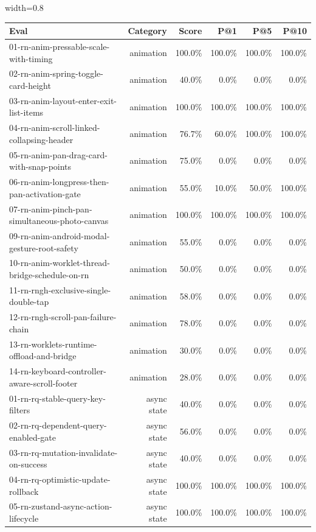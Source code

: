\begin{table}[htbp]
\centering
\begin{adjustbox}{width=0.8\textwidth}
\begin{tabular}{lrrrrr}
\toprule
Eval & Category & Score & P@1 & P@5 & P@10 \\
\midrule
01-rn-anim-pressable-scale-with-timing & animation & 100.0\% & 100.0\% & 100.0\% & 100.0\% \\
02-rn-anim-spring-toggle-card-height & animation & 40.0\% & 0.0\% & 0.0\% & 0.0\% \\
03-rn-anim-layout-enter-exit-list-items & animation & 100.0\% & 100.0\% & 100.0\% & 100.0\% \\
04-rn-anim-scroll-linked-collapsing-header & animation & 76.7\% & 60.0\% & 100.0\% & 100.0\% \\
05-rn-anim-pan-drag-card-with-snap-points & animation & 75.0\% & 0.0\% & 0.0\% & 0.0\% \\
06-rn-anim-longpress-then-pan-activation-gate & animation & 55.0\% & 10.0\% & 50.0\% & 100.0\% \\
07-rn-anim-pinch-pan-simultaneous-photo-canvas & animation & 100.0\% & 100.0\% & 100.0\% & 100.0\% \\
09-rn-anim-android-modal-gesture-root-safety & animation & 55.0\% & 0.0\% & 0.0\% & 0.0\% \\
10-rn-anim-worklet-thread-bridge-schedule-on-rn & animation & 50.0\% & 0.0\% & 0.0\% & 0.0\% \\
11-rn-rngh-exclusive-single-double-tap & animation & 58.0\% & 0.0\% & 0.0\% & 0.0\% \\
12-rn-rngh-scroll-pan-failure-chain & animation & 78.0\% & 0.0\% & 0.0\% & 0.0\% \\
13-rn-worklets-runtime-offload-and-bridge & animation & 30.0\% & 0.0\% & 0.0\% & 0.0\% \\
14-rn-keyboard-controller-aware-scroll-footer & animation & 28.0\% & 0.0\% & 0.0\% & 0.0\% \\
01-rn-rq-stable-query-key-filters & async state & 40.0\% & 0.0\% & 0.0\% & 0.0\% \\
02-rn-rq-dependent-query-enabled-gate & async state & 56.0\% & 0.0\% & 0.0\% & 0.0\% \\
03-rn-rq-mutation-invalidate-on-success & async state & 40.0\% & 0.0\% & 0.0\% & 0.0\% \\
04-rn-rq-optimistic-update-rollback & async state & 100.0\% & 100.0\% & 100.0\% & 100.0\% \\
05-rn-zustand-async-action-lifecycle & async state & 100.0\% & 100.0\% & 100.0\% & 100.0\% \\

\end{tabular}
\end{adjustbox}
\end{table}
